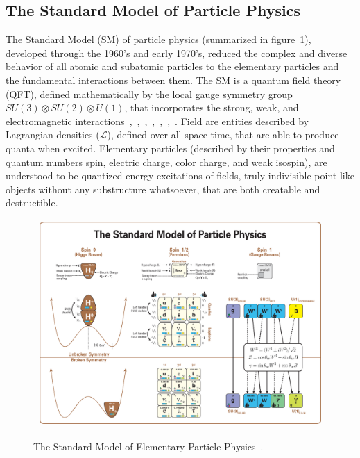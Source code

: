 \begin{refsection}
\section{The Standard Model of Particle Physics}
The Standard Model (SM) of particle physics (summarized in figure~\ref{Standard_Model}), developed through the 1960's and early 1970's, reduced the complex and diverse behavior of all atomic and subatomic particles to the elementary particles and the fundamental interactions between them. 
The SM is a quantum field theory (QFT), defined mathematically by the local gauge symmetry group $SU(3) \otimes SU(2) \otimes U(1)$, that incorporates the strong, weak, and electromagnetic interactions~\cite{GLASHOW1961579},~\cite{PhysRevLett.19.1264},~\cite{doi:10.1142/9789812795915_0034},~\cite{HIGGS1964132},~\cite{PhysRevLett.13.508},~\cite{PhysRevLett.13.321},~\cite{PhysRevLett.30.1343}.
Field are entities described by Lagrangian densities ($\mathcal{L}$), defined over all space-time, that are able to produce quanta when excited.
Elementary particles (described by their properties and quantum numbers spin, electric charge, color charge, and  weak isospin), are understood to be quantized energy excitations of fields, truly indivisible point-like objects without any substructure whatsoever, that are both creatable and destructible.
\begin{figure}[htb]
  \begin{center}
    \begin{tabular}{c}
        \includegraphics[width=0.99\textwidth]{fig_Theory/Standard_Model.png}
    \end{tabular}
    \caption{The Standard Model of Elementary Particle Physics~\cite{StandardModel}.
            }
    \label{Standard_Model}
  \end{center}
\end{figure}


\end{refsection}
